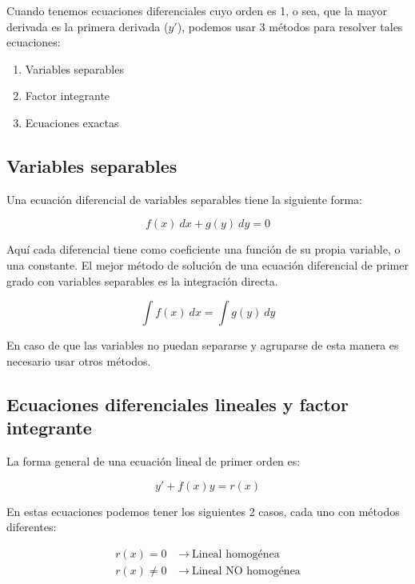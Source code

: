 Cuando tenemos ecuaciones diferenciales cuyo orden es 1, o sea, que la mayor derivada es la primera derivada ($y'$), podemos usar 3 métodos para resolver tales ecuaciones:

\begin{enumerate}
    \item Variables separables
    \item Factor integrante
    \item Ecuaciones exactas
\end{enumerate}

\subsection{Variables separables}

Una ecuación diferencial de variables separables tiene la siguiente forma:

\begin{equation*}
    f(x) \ dx + g(y) \ dy = 0
\end{equation*}

Aquí cada diferencial tiene como coeficiente una función de su propia variable, o una constante. El mejor método de solución de una ecuación diferencial de primer grado con variables separables es la integración directa.

\begin{equation*}
    \int{f(x) \ dx} = \int{g(y) \ dy}
\end{equation*}

En caso de que las variables no puedan separarse y agruparse de esta manera es necesario usar otros métodos.

\subsection{Ecuaciones diferenciales lineales y factor integrante}

La forma general de una ecuación lineal de primer orden es:

\begin{equation}\label{eq:factor_integrante}
    y' + f(x)y = r(x)
\end{equation}

En estas ecuaciones podemos tener los siguientes 2 casos, cada uno con métodos diferentes:

\begin{align*}
    r(x) = 0 \ &\longrightarrow \ \text{Lineal homogénea}
    \\
    r(x) \neq 0 \ &\longrightarrow \ \text{Lineal NO homogénea}
\end{align*}

